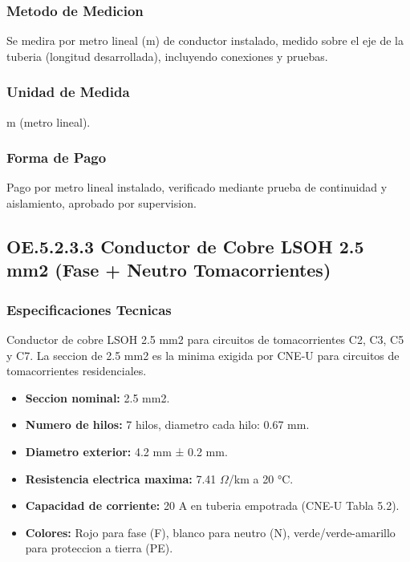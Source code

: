 \subsubsection{Metodo de Medicion}

Se medira por metro lineal (m) de conductor instalado, medido sobre el eje de la tuberia (longitud desarrollada), incluyendo conexiones y pruebas.

\subsubsection{Unidad de Medida}

m (metro lineal).

\subsubsection{Forma de Pago}

Pago por metro lineal instalado, verificado mediante prueba de continuidad y aislamiento, aprobado por supervision.

\subsection{OE.5.2.3.3 Conductor de Cobre LSOH 2.5 mm2 (Fase + Neutro Tomacorrientes)}

\subsubsection{Especificaciones Tecnicas}

Conductor de cobre LSOH 2.5 mm2 para circuitos de tomacorrientes C2, C3, C5 y C7. La seccion de 2.5 mm2 es la minima exigida por CNE-U para circuitos de tomacorrientes residenciales.

\begin{itemize}[nosep]
  \item \textbf{Seccion nominal:} 2.5 mm2.
  \item \textbf{Numero de hilos:} 7 hilos, diametro cada hilo: 0.67 mm.
  \item \textbf{Diametro exterior:} 4.2 mm ± 0.2 mm.
  \item \textbf{Resistencia electrica maxima:} 7.41 $\Omega$/km a 20 °C.
  \item \textbf{Capacidad de corriente:} 20 A en tuberia empotrada (CNE-U Tabla 5.2).
  \item \textbf{Colores:} Rojo para fase (F), blanco para neutro (N), verde/verde-amarillo para proteccion a tierra (PE).
\end{itemize}

